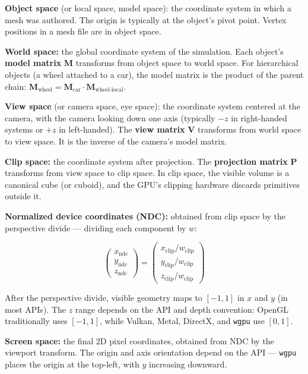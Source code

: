\documentclass[
  11pt,
  letterpaper,
  DIV=11,
  numbers=noendperiod,
  twoside,
  open=right]{scrreprt}
\begin{document}
\textbf{Object space} (or local space, model space): the coordinate
system in which a mesh was authored. The origin is typically at the
object's pivot point. Vertex positions in a mesh file are in object
space.

\textbf{World space:} the global coordinate system of the simulation.
Each object's \textbf{model matrix} \(\mathbf{M}\) transforms from
object space to world space. For hierarchical objects (a wheel attached
to a car), the model matrix is the product of the parent chain:
\(\mathbf{M}_{\text{wheel}} = \mathbf{M}_{\text{car}} \cdot \mathbf{M}_{\text{wheel-local}}\).

\textbf{View space} (or camera space, eye space): the coordinate system
centered at the camera, with the camera looking down one axis (typically
\(-z\) in right-handed systems or \(+z\) in left-handed). The
\textbf{view matrix} \(\mathbf{V}\) transforms from world space to view
space. It is the inverse of the camera's model matrix.

\textbf{Clip space:} the coordinate system after projection. The
\textbf{projection matrix} \(\mathbf{P}\) transforms from view space to
clip space. In clip space, the visible volume is a canonical cube (or
cuboid), and the GPU's clipping hardware discards primitives outside it.

\textbf{Normalized device coordinates (NDC):} obtained from clip space
by the perspective divide --- dividing each component by \(w\):

\[
\begin{pmatrix} x_{\text{ndc}} \\ y_{\text{ndc}} \\ z_{\text{ndc}} \end{pmatrix}
= \begin{pmatrix} x_{\text{clip}} / w_{\text{clip}} \\ y_{\text{clip}} / w_{\text{clip}} \\ z_{\text{clip}} / w_{\text{clip}} \end{pmatrix}
\]

After the perspective divide, visible geometry maps to \([-1, 1]\) in
\(x\) and \(y\) (in most APIs). The \(z\) range depends on the API and
depth convention: OpenGL traditionally uses \([-1, 1]\), while Vulkan,
Metal, DirectX, and \texttt{wgpu} use \([0, 1]\).

\textbf{Screen space:} the final 2D pixel coordinates, obtained from NDC
by the viewport transform. The origin and axis orientation depend on the
API --- \texttt{wgpu} places the origin at the top-left, with \(y\)
increasing downward.
\end{document}
